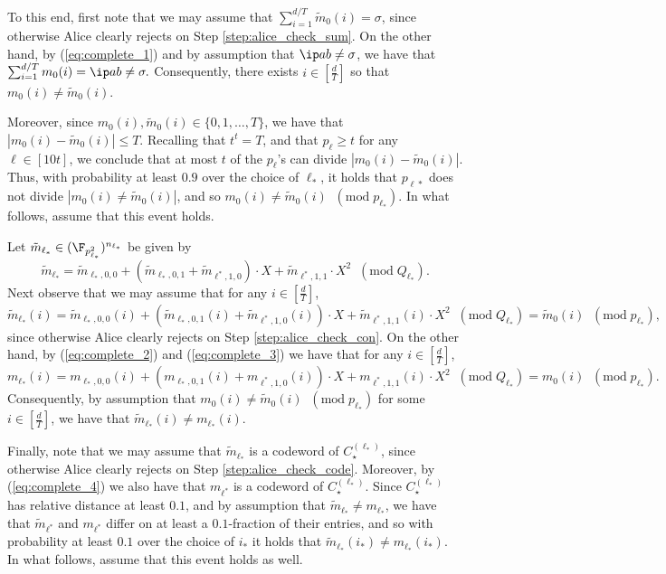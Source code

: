\documentclass[11pt]{article}
\begin{document}
To this end, first note that we may assume that $\sum_{i=1}^{d/T} \tilde m_0(i) = \sigma$, since otherwise Alice clearly rejects on Step \ref{step:alice_check_sum}. 
On the other hand,  by (\ref{eq:complete_1}) and by assumption that $\ip a b \neq \sigma$,  we have that
 $
 \sum_{i=1}^{d/T} m_0 (i)  = \ip a b \neq \sigma.
 $
Consequently, there exists $i \in [\frac d T]$ so that $m_0 (i) \neq \tilde m_0 (i)$. 

Moreover, since $m_0(i), \tilde m_0(i) \in \{0,1,\ldots,T\}$, we have that $|m_0(i) - \tilde m_0(i)|\leq T$. Recalling that 
$t^t = T$, and that $p_\ell \geq t$ for any $\ell \in [10t]$, we conclude that at most $t$ of the $p_\ell$'s can divide $|m_0(i) - \tilde m_0(i)|$.
Thus, with probability at least $0.9$ over the choice of $\ell_*$, it holds that  $p_{\ell*}$ does not divide $|m_0(i) \neq \tilde m_0(i) |$, and so $m_0(i) \neq \tilde m_0(i) \;\;(\mathrm{mod} \;p_{\ell_*})$. In what follows, assume that this event holds.

Let $\tilde m_{\ell_*} \in (\F_{p_{\ell_*}^2})^{n_{\ell_*}}$ be given by 
$$  \tilde m_{\ell_*} = 
   \tilde   m_{\ell_*,0,0}   + ( \tilde m_{\ell_*,0,1}   + \tilde m_{\ell^*,1,0} ) \cdot X +  \tilde m_{\ell^*,1,1}   \cdot X^2   \;\;(\mathrm{mod} \;Q_{\ell_*}).$$
Next observe that we may assume that for any $i \in [\frac d T]$,
$$
  \tilde m_{\ell_*} (i)  = 
   \tilde   m_{\ell_*,0,0}  (i)  + ( \tilde m_{\ell_*,0,1} (i)  + \tilde m_{\ell^*,1,0} (i)) \cdot X +  \tilde m_{\ell^*,1,1}  (i) \cdot X^2   \;\;(\mathrm{mod} \;Q_{\ell_*}) 
=    \tilde m_0(i) \;\;(\mathrm{mod} \;p_{\ell_*}),
$$
   since otherwise Alice clearly rejects on Step \ref{step:alice_check_con}. 
On the other hand, by (\ref{eq:complete_2}) and (\ref{eq:complete_3})
 we have that for any $i \in [\frac d T]$,
$$
 m_{\ell_*} (i)  = 
   m_{\ell_*,0,0}  (i)  + (m_{\ell_*,0,1} (i)  +  m_{\ell^*,1,0} (i)) \cdot X + m_{\ell^*,1,1}  (i) \cdot X^2   \;\;(\mathrm{mod} \;Q_{\ell_*}) 
=    m_0(i) \;\;(\mathrm{mod} \;p_{\ell_*}).
$$
Consequently, by assumption that $m_0(i) \neq \tilde m_0(i) \;\;(\mathrm{mod} \;p_{\ell_*})$ for some $i \in [\frac d T]$, we have that $\tilde m_{\ell_*}(i) \neq m_{\ell_*}(i)$.

Finally, note that we may assume that $\tilde m_{\ell_*}$ is a codeword of $C_\star^{(\ell_*)}$, since otherwise Alice clearly rejects on Step \ref{step:alice_check_code}. Moreover, by (\ref{eq:complete_4}) we also have that $m_{\ell^*}$ is a codeword of $C_\star^{(\ell_*)}$. Since $C_\star^{(\ell_*)}$ has relative distance at least $0.1$, and by assumption that $\tilde m_{\ell_*} \neq m_{\ell_*}$, we have that $\tilde m_{\ell^*}$ and $m_{\ell^*}$ differ on at least a $0.1$-fraction of their entries, and so with probability at least $0.1$ over the choice of $i_*$ it holds that $\tilde m_{\ell_*} (i_*) \neq m_{\ell_*} (i_*)$. In what follows, assume that this event holds as well.
\end{document}
